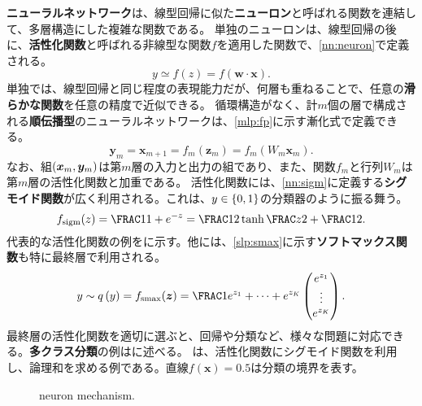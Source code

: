 \documentclass[10pt,a4paper]{book}
\begin{document}
\textbf{ニューラルネットワーク}は、線型回帰に似た\textbf{ニューロン}と呼ばれる関数を連結して、多層構造にした複雑な関数である。
単独のニューロンは、線型回帰の後に、\textbf{活性化関数}と呼ばれる非線型な関数$f$を適用した関数で、\eqref{nn:neuron}で定義される。
%
\begin{equation}
\label{eq:nn:neuron}
y \simeq f(z) = f(\bm{w} \cdot \bm{x}).
\end{equation}
%
単独では、線型回帰と同じ程度の表現能力だが、何層も重ねることで、任意の\textbf{滑らかな関数}を任意の精度で近似できる。
循環構造がなく、計$m$個の層で構成される\textbf{順伝播型}のニューラルネットワークは、\eqref{mlp:fp}に示す漸化式で定義できる。
%
\begin{equation}
\label{eq:mlp:fp}
\bm{y}_m = \bm{x}_{m+1} = f_m(\bm{z}_m) = f_m(W_m\bm{x}_m).
\end{equation}
%
なお、組$\pair{\bm{x}_m}{\bm{y}_m}$は第$m$層の入力と出力の組であり、また、関数$f_m$と行列$W_m$は第$m$層の活性化関数と加重である。
活性化関数には、\eqref{nn:sigm}に定義する\textbf{シグモイド関数}が広く利用される。これは、$y\in\seq{0,1}$の分類器のように振る舞う。
%
\begin{equation}
\label{eq:nn:sigm}
\sigm(z) = \frac{1}{1 + e^{-z}} = \frac{1}{2}\tanh\frac{z}{2} + \frac{1}{2}.
\end{equation}
%
代表的な活性化関数の例をに示す。他には、\eqref{slp:smax}に示す\textbf{ソフトマックス関数}も特に最終層で利用される。
%
\begin{equation}
\label{eq:slp:smax}
y \sim \qrob{y} = \smax(\bm{z}) =
\frac{1}{e^{z_1}+\cdots+e^{z_K}}
\begin{pmatrix}
e^{z_1}\\
\vdots\\
e^{z_K}
\end{pmatrix}.
\end{equation}
%
最終層の活性化関数を適切に選ぶと、回帰や分類など、様々な問題に対応できる。\textbf{多クラス分類}の例はに述べる。
は、活性化関数にシグモイド関数を利用し、論理和を求める例である。直線$f(\bm{x})=0.5$は分類の境界を表す。

\begin{figure}[h]
\centering
{}
\caption{neuron mechanism.\label{fig:slp}}
\end{figure}
\end{document}
